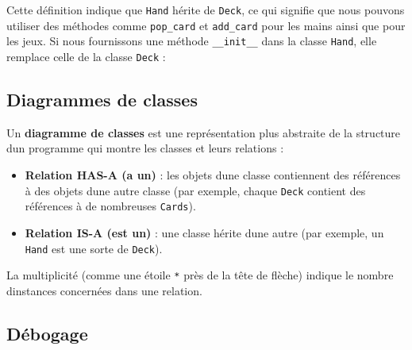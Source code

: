Cette définition indique que \texttt{Hand} hérite de \texttt{Deck}, ce
qui signifie que nous pouvons utiliser des méthodes comme
\texttt{pop\_card} et \texttt{add\_card} pour les mains ainsi que pour
les jeux. Si nous fournissons une méthode \texttt{\_\_init\_\_} dans la
classe \texttt{Hand}, elle remplace celle de la classe \texttt{Deck} :

\begin{Shaded}
\begin{Highlighting}[]


 \NormalTok{(}\OperatorTok{=}\NormalTok{):}
    \OperatorTok{=}\NormalTok{ []}
    \OperatorTok{=}
\end{Highlighting}
\end{Shaded}

\hypertarget{diagrammes-de-classes}{%
\subsection{Diagrammes de classes}\label{diagrammes-de-classes}}

Un \textbf{diagramme de classes} est une représentation plus abstraite
de la structure d\textquotesingle un programme qui montre les classes et
leurs relations :

\begin{itemize}
\tightlist
\item
  \textbf{Relation HAS-A (a un)} : les objets d\textquotesingle une
  classe contiennent des références à des objets d\textquotesingle une
  autre classe (par exemple, chaque \texttt{Deck} contient des
  références à de nombreuses \texttt{Cards}).
\item
  \textbf{Relation IS-A (est un)} : une classe hérite
  d\textquotesingle une autre (par exemple, un \texttt{Hand} est une
  sorte de \texttt{Deck}).
\end{itemize}

La multiplicité (comme une étoile \texttt{*} près de la tête de flèche)
indique le nombre d\textquotesingle instances concernées dans une
relation.

\hypertarget{duxe9bogage}{%
\subsection{Débogage}\label{duxe9bogage}}

